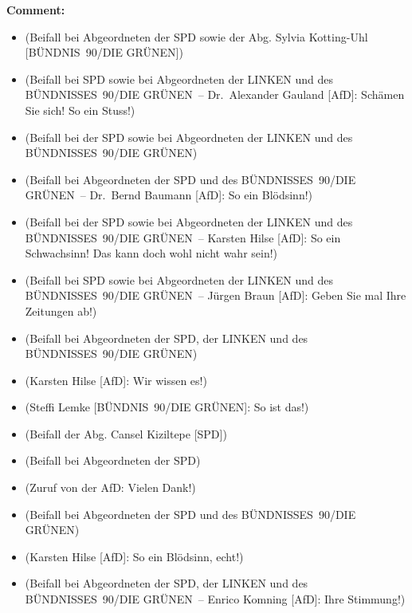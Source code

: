 \documentclass{article}
\begin{document}
\noindent\textbf{Comment:}
\begin{itemize}
    \setlength\itemsep{-3pt}
    \item (Beifall bei Abgeordneten der SPD sowie der Abg. Sylvia Kotting-Uhl [BÜNDNIS 90/DIE GRÜNEN])
    \setlength\itemsep{-3pt}
    \item (Beifall bei SPD sowie bei Abgeordneten der LINKEN und des BÜNDNISSES 90/DIE GRÜNEN – Dr. Alexander Gauland [AfD]: Schämen Sie sich! So ein Stuss!)
    \setlength\itemsep{-3pt}
    \item (Beifall bei der SPD sowie bei Abgeordneten der LINKEN und des BÜNDNISSES 90/DIE GRÜNEN)
    \setlength\itemsep{-3pt}
    \item (Beifall bei Abgeordneten der SPD und des BÜNDNISSES 90/DIE GRÜNEN – Dr. Bernd Baumann [AfD]: So ein Blödsinn!)
    \setlength\itemsep{-3pt}
    \item (Beifall bei der SPD sowie bei Abgeordneten der LINKEN und des BÜNDNISSES 90/DIE GRÜNEN – Karsten Hilse [AfD]: So ein Schwachsinn! Das kann doch wohl nicht wahr sein!)
    \setlength\itemsep{-3pt}
    \item (Beifall bei SPD sowie bei Abgeordneten der LINKEN und des BÜNDNISSES 90/DIE GRÜNEN – Jürgen Braun [AfD]: Geben Sie mal Ihre Zeitungen ab!)
    \setlength\itemsep{-3pt}
    \item (Beifall bei Abgeordneten der SPD, der LINKEN und des BÜNDNISSES 90/DIE GRÜNEN)
    \setlength\itemsep{-3pt}
    \item (Karsten Hilse [AfD]: Wir wissen es!)
    \setlength\itemsep{-3pt}
    \item (Steffi Lemke [BÜNDNIS 90/DIE GRÜNEN]: So ist das!)
    \setlength\itemsep{-3pt}
    \item (Beifall der Abg. Cansel Kiziltepe [SPD])
    \setlength\itemsep{-3pt}
    \item (Beifall bei Abgeordneten der SPD)
    \setlength\itemsep{-3pt}
    \item (Zuruf von der AfD: Vielen Dank!)
    \setlength\itemsep{-3pt}
    \item (Beifall bei Abgeordneten der SPD und des BÜNDNISSES 90/DIE GRÜNEN)
    \setlength\itemsep{-3pt}
    \item (Karsten Hilse [AfD]: So ein Blödsinn, echt!)
    \setlength\itemsep{-3pt}
    \item (Beifall bei Abgeordneten der SPD, der LINKEN und des BÜNDNISSES 90/DIE GRÜNEN – Enrico Komning [AfD]: Ihre Stimmung!)
\end{itemize}
\end{document}
